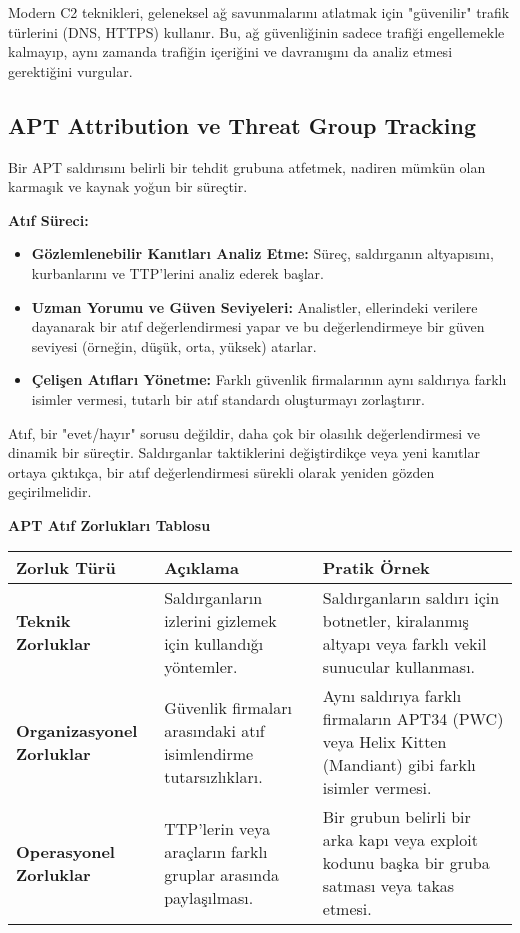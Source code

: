 Modern C2 teknikleri, geleneksel ağ savunmalarını atlatmak için "güvenilir" trafik türlerini (DNS, HTTPS) kullanır. Bu, ağ güvenliğinin sadece trafiği engellemekle kalmayıp, aynı zamanda trafiğin içeriğini ve davranışını da analiz etmesi gerektiğini vurgular.

\subsection{APT Attribution ve Threat Group Tracking}

Bir APT saldırısını belirli bir tehdit grubuna atfetmek, nadiren mümkün olan karmaşık ve kaynak yoğun bir süreçtir.

\textbf{Atıf Süreci:}

\begin{itemize}
    \item \textbf{Gözlemlenebilir Kanıtları Analiz Etme:} Süreç, saldırganın altyapısını, kurbanlarını ve TTP'lerini analiz ederek başlar.
    \item \textbf{Uzman Yorumu ve Güven Seviyeleri:} Analistler, ellerindeki verilere dayanarak bir atıf değerlendirmesi yapar ve bu değerlendirmeye bir güven seviyesi (örneğin, düşük, orta, yüksek) atarlar.
    \item \textbf{Çelişen Atıfları Yönetme:} Farklı güvenlik firmalarının aynı saldırıya farklı isimler vermesi, tutarlı bir atıf standardı oluşturmayı zorlaştırır.
\end{itemize}

Atıf, bir "evet/hayır" sorusu değildir, daha çok bir olasılık değerlendirmesi ve dinamik bir süreçtir. Saldırganlar taktiklerini değiştirdikçe veya yeni kanıtlar ortaya çıktıkça, bir atıf değerlendirmesi sürekli olarak yeniden gözden geçirilmelidir.

\textbf{APT Atıf Zorlukları Tablosu}

\begin{tabularx}{\textwidth}{|l|X|X|}
\hline
\textbf{Zorluk Türü} & \textbf{Açıklama} & \textbf{Pratik Örnek} \\
\hline
\textbf{Teknik Zorluklar} & Saldırganların izlerini gizlemek için kullandığı yöntemler. & Saldırganların saldırı için botnetler, kiralanmış altyapı veya farklı vekil sunucular kullanması. \\
\hline
\textbf{Organizasyonel Zorluklar} & Güvenlik firmaları arasındaki atıf isimlendirme tutarsızlıkları. & Aynı saldırıya farklı firmaların APT34 (PWC) veya Helix Kitten (Mandiant) gibi farklı isimler vermesi. \\
\hline
\textbf{Operasyonel Zorluklar} & TTP'lerin veya araçların farklı gruplar arasında paylaşılması. & Bir grubun belirli bir arka kapı veya exploit kodunu başka bir gruba satması veya takas etmesi. \\
\hline
\end{tabularx}

